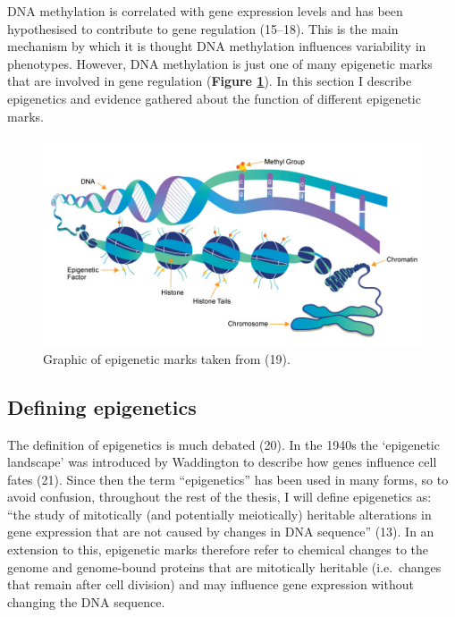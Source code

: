\documentclass[11pt,oneside]{bristolthesis}
\begin{document}
DNA methylation is correlated with gene expression levels and has been hypothesised to contribute to gene regulation (15--18). This is the main mechanism by which it is thought DNA methylation influences variability in phenotypes. However, DNA methylation is just one of many epigenetic marks that are involved in gene regulation (\textbf{Figure \ref{fig:epigenetic-marks}}). In this section I describe epigenetics and evidence gathered about the function of different epigenetic marks.


\begin{figure}

{\centering \includegraphics[width=1\linewidth]{figure/01-introduction/epigenetic-marks} 

}

\caption{Graphic of epigenetic marks taken from (19).}\label{fig:epigenetic-marks}
\end{figure}
\hypertarget{defining-epigenetics}{%
\subsection{Defining epigenetics}\label{defining-epigenetics}}

The definition of epigenetics is much debated (20). In the 1940s the `epigenetic landscape' was introduced by Waddington to describe how genes influence cell fates (21). Since then the term ``epigenetics'' has been used in many forms, so to avoid confusion, throughout the rest of the thesis, I will define epigenetics as: ``the study of mitotically (and potentially meiotically) heritable alterations in gene expression that are not caused by changes in DNA sequence'' (13). In an extension to this, epigenetic marks therefore refer to chemical changes to the genome and genome-bound proteins that are mitotically heritable (i.e.~changes that remain after cell division) and may influence gene expression without changing the DNA sequence.
\end{document}
